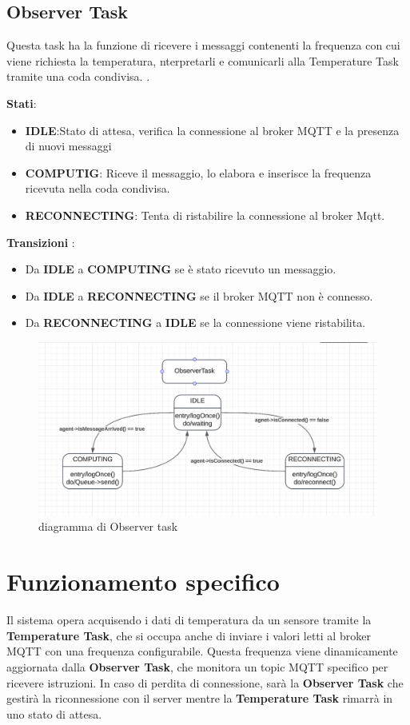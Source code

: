 \documentclass{report}
\begin{document}
\subsection{Observer Task}

\par{
    Questa task ha la funzione di ricevere i messaggi contenenti la frequenza con cui viene richiesta la temperatura, nterpretarli e comunicarli alla Temperature Task tramite una coda condivisa.
    .\newline
}
\par{\textbf{Stati}:}
\begin{itemize}
    \item \textbf{IDLE}:Stato di attesa, verifica la connessione al broker MQTT e la presenza di nuovi messaggi
    \item \textbf{COMPUTIG}: Riceve il messaggio, lo elabora e inserisce la frequenza ricevuta nella coda condivisa.
    \item \textbf{RECONNECTING}: Tenta di ristabilire la connessione al broker Mqtt.
\end{itemize}
\par{
    \textbf{Transizioni} :
}
\begin{itemize}
    \item Da \textbf{IDLE} a \textbf{COMPUTING} se è stato ricevuto un messaggio.
    \item Da \textbf{IDLE} a \textbf{RECONNECTING} se il broker MQTT non è connesso.
    \item Da \textbf{RECONNECTING} a \textbf{IDLE} se la connessione viene ristabilita.
\end{itemize}

\begin{figure}[h]
    \centering
    \includegraphics[width=0.8\linewidth]{img/assignment-03/ObserverTask.png}
    \caption{diagramma di Observer task}
    \label{fig:stati}
\end{figure}

\section{Funzionamento specifico}
\par{
Il sistema opera acquisendo i dati di temperatura da un sensore tramite la \textbf{Temperature Task}, che si occupa anche di inviare i valori letti al broker MQTT con una frequenza configurabile. Questa frequenza viene dinamicamente aggiornata dalla \textbf{Observer Task}, che monitora un topic MQTT specifico per ricevere istruzioni. In caso di perdita di connessione, sarà la \textbf{Observer Task} che gestirà la riconnessione con il server mentre la \textbf{Temperature Task} rimarrà in uno stato di attesa.
}
\end{document}
